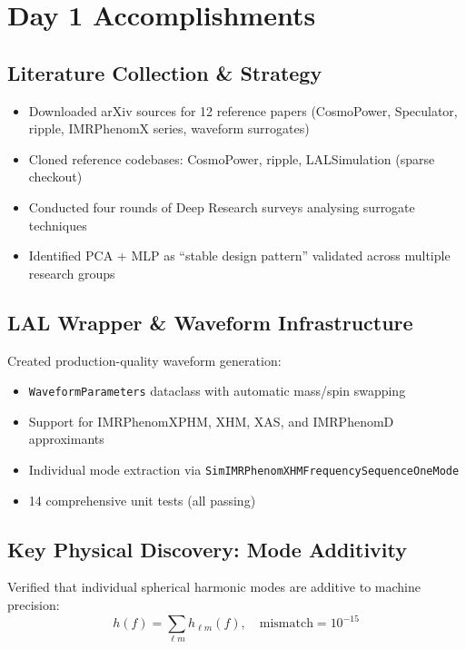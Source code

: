 \documentclass[11pt,a4paper]{article}
\begin{document}
\section{Day 1 Accomplishments}

\subsection{Literature Collection \& Strategy}

\begin{itemize}
    \item Downloaded arXiv sources for 12 reference papers (CosmoPower, Speculator, ripple, IMRPhenomX series, waveform surrogates)
    \item Cloned reference codebases: CosmoPower, ripple, LALSimulation (sparse checkout)
    \item Conducted four rounds of Deep Research surveys analysing surrogate techniques
    \item Identified PCA + MLP as ``stable design pattern'' validated across multiple research groups
\end{itemize}

\subsection{LAL Wrapper \& Waveform Infrastructure}

Created production-quality waveform generation:
\begin{itemize}
    \item \texttt{WaveformParameters} dataclass with automatic mass/spin swapping
    \item Support for IMRPhenomXPHM, XHM, XAS, and IMRPhenomD approximants
    \item Individual mode extraction via \texttt{SimIMRPhenomXHMFrequencySequenceOneMode}
    \item 14 comprehensive unit tests (all passing)
\end{itemize}

\subsection{Key Physical Discovery: Mode Additivity}

Verified that individual spherical harmonic modes are additive to machine precision:
\begin{equation}
    h(f) = \sum_{\ell m} h_{\ell m}(f), \quad \text{mismatch} = 10^{-15}
\end{equation}
\end{document}
